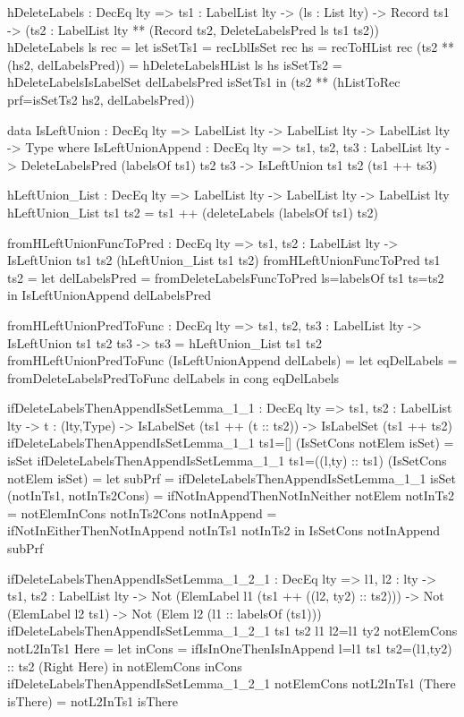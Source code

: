 \begin{code}
hDeleteLabels : DecEq lty => {ts1 : LabelList lty} -> 
  (ls : List lty) -> Record ts1 ->
  (ts2 : LabelList lty ** (Record ts2, DeleteLabelsPred ls ts1 ts2))
hDeleteLabels ls rec =
  let
    isSetTs1 = recLblIsSet rec
    hs = recToHList rec
    (ts2 ** (hs2, delLabelsPred)) = hDeleteLabelsHList ls hs
    isSetTs2 = hDeleteLabelsIsLabelSet delLabelsPred isSetTs1
  in
    (ts2 ** (hListToRec {prf=isSetTs2} hs2, delLabelsPred))

data IsLeftUnion : DecEq lty => LabelList lty -> LabelList lty -> 
  LabelList lty -> Type where
  IsLeftUnionAppend : DecEq lty => 
    {ts1, ts2, ts3 : LabelList lty} -> 
    DeleteLabelsPred (labelsOf ts1) ts2 ts3 -> 
    IsLeftUnion ts1 ts2 (ts1 ++ ts3)
    
hLeftUnion_List : DecEq lty => LabelList lty -> LabelList lty -> 
  LabelList lty
hLeftUnion_List ts1 ts2 = ts1 ++ (deleteLabels (labelsOf ts1) ts2)

fromHLeftUnionFuncToPred : DecEq lty => 
  {ts1, ts2 : LabelList lty} -> 
  IsLeftUnion ts1 ts2 (hLeftUnion_List ts1 ts2)    
fromHLeftUnionFuncToPred {ts1} {ts2} = 
  let delLabelsPred = 
        fromDeleteLabelsFuncToPred {ls=labelsOf ts1} {ts=ts2}
  in IsLeftUnionAppend delLabelsPred
  
fromHLeftUnionPredToFunc : DecEq lty => 
  {ts1, ts2, ts3 : LabelList lty} -> IsLeftUnion ts1 ts2 ts3 ->
  ts3 = hLeftUnion_List ts1 ts2
fromHLeftUnionPredToFunc (IsLeftUnionAppend delLabels) =
  let eqDelLabels = fromDeleteLabelsPredToFunc delLabels
  in cong eqDelLabels
  
ifDeleteLabelsThenAppendIsSetLemma_1_1 : DecEq lty => 
  {ts1, ts2 : LabelList lty} -> {t : (lty,Type)} ->
  IsLabelSet (ts1 ++ (t :: ts2)) -> IsLabelSet (ts1 ++ ts2)
ifDeleteLabelsThenAppendIsSetLemma_1_1 {ts1=[]} 
  (IsSetCons notElem isSet) = isSet
ifDeleteLabelsThenAppendIsSetLemma_1_1 {ts1=((l,ty) :: ts1)} 
  (IsSetCons notElem isSet) = 
  let subPrf = ifDeleteLabelsThenAppendIsSetLemma_1_1 isSet
      (notInTs1, notInTs2Cons) = 
        ifNotInAppendThenNotInNeither notElem
      notInTs2 = notElemInCons notInTs2Cons
      notInAppend = ifNotInEitherThenNotInAppend notInTs1 notInTs2
  in IsSetCons notInAppend subPrf

ifDeleteLabelsThenAppendIsSetLemma_1_2_1 : DecEq lty => 
  {l1, l2 : lty} -> {ts1, ts2 : LabelList lty} -> 
  Not (ElemLabel l1 (ts1 ++ ((l2, ty2) :: ts2))) -> 
  Not (ElemLabel l2 ts1) -> Not (Elem l2 (l1 :: labelsOf (ts1)))
ifDeleteLabelsThenAppendIsSetLemma_1_2_1 {ts1} {ts2} {l1} {l2=l1} 
  {ty2} notElemCons notL2InTs1 Here =
  let inCons = ifIsInOneThenIsInAppend {l=l1} {ts1} 
        {ts2=(l1,ty2) :: ts2} (Right Here)
  in notElemCons inCons
ifDeleteLabelsThenAppendIsSetLemma_1_2_1 notElemCons notL2InTs1 
  (There isThere) = notL2InTs1 isThere


\end{code}
